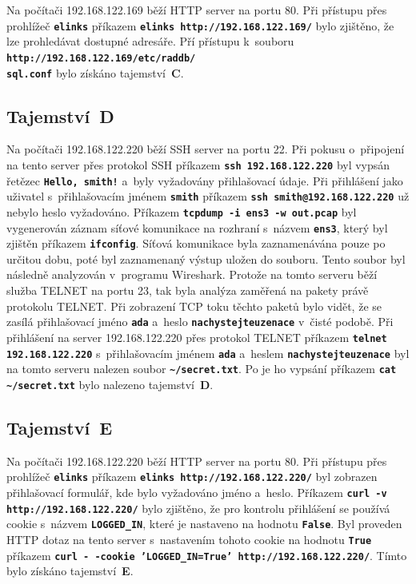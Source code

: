 \documentclass[a4paper, 10pt, twocolumn]{article}
\renewcommand{\tt}[1]{\texttt{\textbf{#1}}}
\begin{document}
	Na počítači 192.168.122.169 běží HTTP server na portu 80.
	Při přístupu přes prohlížeč \tt{elinks} příkazem \tt{elinks
	http://192.168.122.169/} bylo zjištěno, že lze prohledávat
	dostupné adresáře. Pří přístupu k~souboru
	\tt{http://192.168.122.169/etc/raddb/\\sql.conf} bylo získáno
	tajemství~\textbf{C}.

	\subsection{Tajemství~D}
	\label{sec:secG}

	Na počítači 192.168.122.220 běží SSH server na portu 22. Při
	pokusu o~připojení na tento server přes protokol SSH příkazem
	\tt{ssh 192.168.122.220} byl vypsán řetězec \tt{Hello, smith!}
	a~byly vyžadovány přihlašovací údaje. Při přihlášení jako uživatel
	s~přihlašovacím jménem \tt{smith} příkazem \tt{ssh
	smith@192.168.122.220} už nebylo heslo vyžadováno. Příkazem
	\tt{tcpdump -i ens3 -w out.pcap} byl vygenerován záznam síťové
	komunikace na rozhraní s~názvem \tt{ens3}, který byl zjištěn
	příkazem \tt{ifconfig}. Síťová komunikace byla zaznamenávána
	pouze po určitou dobu, poté byl zaznamenaný výstup uložen do
	souboru. Tento soubor byl následně analyzován v~programu Wireshark.
	Protože na tomto serveru běží služba TELNET na portu 23, tak byla
	analýza zaměřená na pakety právě protokolu TELNET. Při zobrazení
	TCP toku těchto paketů bylo vidět, že se zasílá přihlašovací
	jméno \tt{ada} a~heslo \tt{nachystejteuzenace} v~čisté podobě.
	Při přihlášení na server 192.168.122.220 přes protokol TELNET
	příkazem \tt{telnet 192.168.122.220} s~přihlašovacím jménem
	\tt{ada} a~heslem \tt{nachystejteuzenace} byl na tomto serveru
	nalezen soubor \tt{\textasciitilde/secret.txt}. Po je ho vypsání
	příkazem \tt{cat \textasciitilde/secret.txt} bylo nalezeno
	tajemství~\textbf{D}.

	\subsection{Tajemství~E}

	Na počítači 192.168.122.220 běží HTTP server na portu 80. Při
	přístupu přes prohlížeč \tt{elinks} příkazem \tt{elinks
	http://192.168.122.220/} byl zobrazen přihlašovací formulář, kde
	bylo vyžadováno jméno a~heslo. Příkazem \tt{curl -v
	http://192.168.122.220/} bylo zjištěno, že pro kontrolu přihlášení
	se používá cookie s~názvem \tt{LOGGED\_IN}, které je nastaveno na
	hodnotu \tt{False}. Byl proveden HTTP dotaz na tento server
	s~nastavením tohoto cookie na hodnotu \tt{True} příkazem \tt{curl
	-\,-cookie 'LOGGED\_IN=True' http://192.168.122.220/}. Tímto bylo
	získáno tajemství~\textbf{E}.
\end{document}
